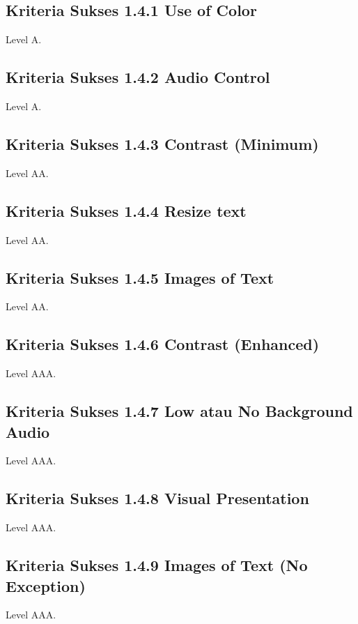 {\subsection{Kriteria Sukses 1.4.1 Use of Color}
\label{sec:kriteria_1.4.1}
Level A.

\subsection{Kriteria Sukses 1.4.2 Audio Control}
\label{sec:kriteria_1.4.2}
Level A.

\subsection{Kriteria Sukses 1.4.3 Contrast (Minimum)}
\label{sec:kriteria_1.4.3}
Level AA.

\subsection{Kriteria Sukses 1.4.4 Resize text}
\label{sec:kriteria_1.4.4}
Level AA.

\subsection{Kriteria Sukses 1.4.5 Images of Text}
\label{sec:kriteria_1.4.5}
Level AA.

\subsection{Kriteria Sukses 1.4.6 Contrast (Enhanced)}
\label{sec:kriteria_1.4.6}
Level AAA.

\subsection{Kriteria Sukses 1.4.7 Low atau No Background Audio}
\label{sec:kriteria_1.4.7}
Level AAA.

\subsection{Kriteria Sukses 1.4.8 Visual Presentation}
\label{sec:kriteria_1.4.8}
Level AAA.

\subsection{Kriteria Sukses 1.4.9 Images of Text (No Exception)}
\label{sec:kriteria_1.4.9}
Level AAA.

}
